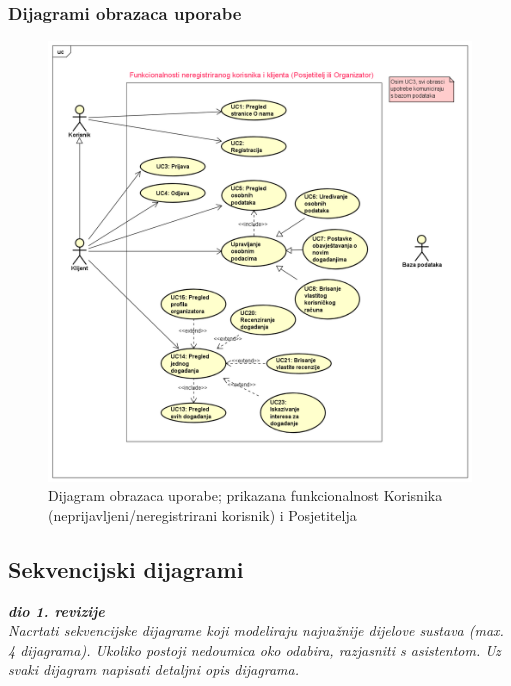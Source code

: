 					
					
				\newpage
					
					
				\subsubsection{Dijagrami obrazaca uporabe}
					
				\begin{figure}[H]
					\includegraphics[scale=0.5]{dijagrami/uc1.PNG} %
					\centering
					\caption{Dijagram obrazaca uporabe; prikazana funkcionalnost Korisnika (neprijavljeni/neregistrirani korisnik) i Posjetitelja}
					\label{fig:promjene}
				\end{figure}
				
				
				\newpage
				
			\subsection{Sekvencijski dijagrami}
				
				\textbf{\textit{dio 1. revizije}}\\
				
				\textit{Nacrtati sekvencijske dijagrame koji modeliraju najvažnije dijelove sustava (max. 4 dijagrama). Ukoliko postoji nedoumica oko odabira, razjasniti s asistentom. Uz svaki dijagram napisati detaljni opis dijagrama.}
				\eject
	
